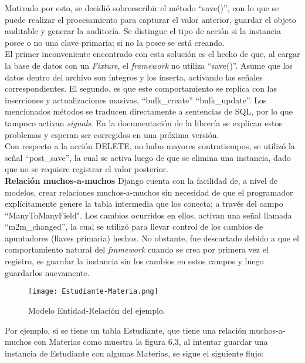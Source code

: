 Motivado por esto, se decidió sobreescribir el método “save()”, con lo que se puede realizar el procesamiento para capturar el valor anterior, guardar el objeto auditable y generar la auditoría. Se distingue el tipo de acción si la instancia posee o no una clave primaria; si no la posee se está creando.\\

El primer inconveniente encontrado con esta solución es el hecho de que, al cargar la base de datos con un \textit{Fixture}, el \textit{framework} no utiliza “save()”. Asume que los datos dentro del archivo son íntegros y los inserta, activando las señales correspondientes. El segundo, es que este comportamiento se replica con las inserciones y actualizaciones masivas, “bulk\_create” “bulk\_update”. Los mencionados métodos se traducen directamente a sentencias de SQL, por lo que tampoco activan \textit{signals}.  En la documentación de la librería se explican estos problemas y esperan ser corregidos en una próxima versión.\\

Con respecto a la acción DELETE, no hubo mayores contratiempos, se utilizó la señal “post\_save”, la cual se activa luego de que se elimina una instancia, dado que no se requiere registrar el valor posterior.\\


\textbf{Relación muchos-a-muchos} Django cuenta con la facilidad de, a nivel de modelos, crear relaciones muchos-a-muchos sin necesidad de que el programador explícitamente genere la tabla intermedia que los conecta; a través del campo “ManyToManyField". Los cambios ocurridos en ellos, activan una señal llamada “m2m\_changed”, la cual se utilizó para llevar control de los cambios de apuntadores (llaves primaria) hechos. No obstante, fue descartado debido a que el comportamiento natural del \textit{framework} cuando se crea por primera vez el registro, es guardar la instancia sin los cambios en estos campos y luego guardarlos nuevamente.\\

\begin{figure}[h]
\centering
\texttt{[image: Estudiante-Materia.png]}
\caption{Modelo Entidad-Relación del ejemplo.}
\label{fig:figura6.3}
\end{figure}

Por ejemplo, si se tiene un tabla Estudiante, que tiene una relación muchos-a-muchos con Materias como muestra la figura 6.3, al intentar guardar una instancia de Estudiante con algunas Materias, se sigue el siguiente flujo:\\

